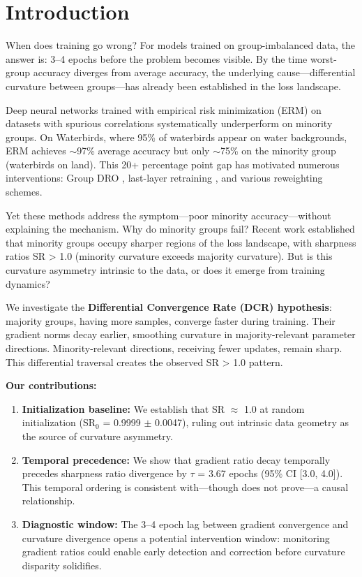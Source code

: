 \section{Introduction}

When does training go wrong? For models trained on group-imbalanced data, the answer is: 3--4 epochs before the problem becomes visible. By the time worst-group accuracy diverges from average accuracy, the underlying cause---differential curvature between groups---has already been established in the loss landscape.

Deep neural networks trained with empirical risk minimization (ERM) on datasets with spurious correlations systematically underperform on minority groups. On Waterbirds, where 95\% of waterbirds appear on water backgrounds, ERM achieves $\sim$97\% average accuracy but only $\sim$75\% on the minority group (waterbirds on land). This 20+ percentage point gap has motivated numerous interventions: Group DRO \cite{sagawa2020distributionally}, last-layer retraining \cite{kirichenko2023last}, and various reweighting schemes.

Yet these methods address the symptom---poor minority accuracy---without explaining the mechanism. Why do minority groups fail? Recent work established that minority groups occupy sharper regions of the loss landscape, with sharpness ratios SR > 1.0 (minority curvature exceeds majority curvature). But is this curvature asymmetry intrinsic to the data, or does it emerge from training dynamics?

We investigate the \textbf{Differential Convergence Rate (DCR) hypothesis}: majority groups, having more samples, converge faster during training. Their gradient norms decay earlier, smoothing curvature in majority-relevant parameter directions. Minority-relevant directions, receiving fewer updates, remain sharp. This differential traversal creates the observed SR > 1.0 pattern.

\textbf{Our contributions:}
\begin{enumerate}
    \item \textbf{Initialization baseline:} We establish that SR $\approx$ 1.0 at random initialization (SR$_0$ = 0.9999 $\pm$ 0.0047), ruling out intrinsic data geometry as the source of curvature asymmetry.
    \item \textbf{Temporal precedence:} We show that gradient ratio decay temporally precedes sharpness ratio divergence by $\tau$ = 3.67 epochs (95\% CI [3.0, 4.0]). This temporal ordering is consistent with---though does not prove---a causal relationship.
    \item \textbf{Diagnostic window:} The 3--4 epoch lag between gradient convergence and curvature divergence opens a potential intervention window: monitoring gradient ratios could enable early detection and correction before curvature disparity solidifies.
\end{enumerate}

